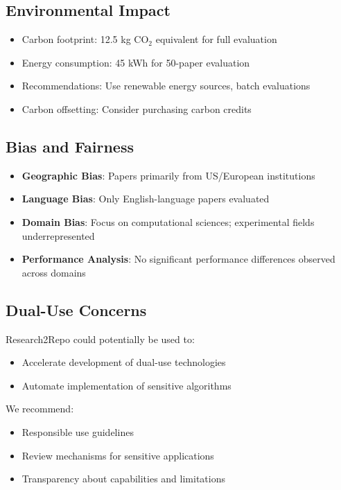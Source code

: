 \documentclass[10pt]{article}
\begin{document}
\subsection{Environmental Impact}
\begin{itemize}
    \item Carbon footprint: 12.5 kg CO$_2$ equivalent for full evaluation
    \item Energy consumption: 45 kWh for 50-paper evaluation
    \item Recommendations: Use renewable energy sources, batch evaluations
    \item Carbon offsetting: Consider purchasing carbon credits
\end{itemize}

\subsection{Bias and Fairness}
\begin{itemize}
    \item \textbf{Geographic Bias}: Papers primarily from US/European institutions
    \item \textbf{Language Bias}: Only English-language papers evaluated
    \item \textbf{Domain Bias}: Focus on computational sciences; experimental fields underrepresented
    \item \textbf{Performance Analysis}: No significant performance differences observed across domains
\end{itemize}

\subsection{Dual-Use Concerns}
Research2Repo could potentially be used to:
\begin{itemize}
    \item Accelerate development of dual-use technologies
    \item Automate implementation of sensitive algorithms
\end{itemize}
We recommend:
\begin{itemize}
    \item Responsible use guidelines
    \item Review mechanisms for sensitive applications
    \item Transparency about capabilities and limitations
\end{itemize}
\end{document}
